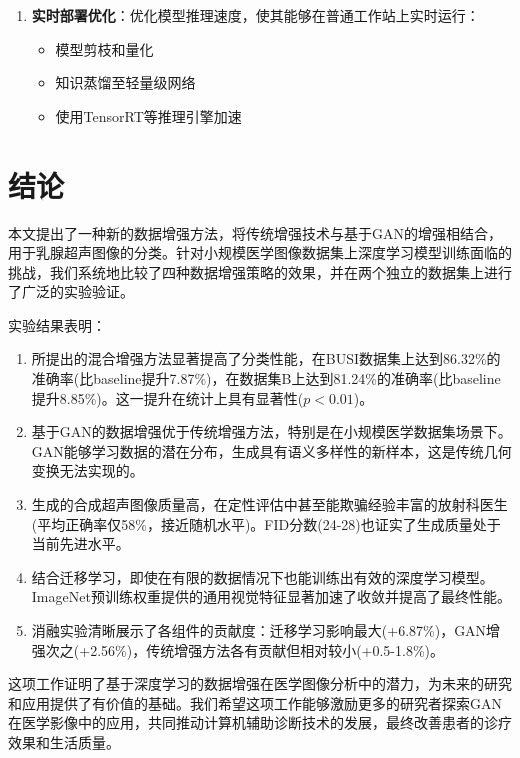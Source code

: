 \documentclass[supercite]{../Hust-undergraduate-translation/Experimental_Report}
\theoremstyle{definition}
\begin{document}
\begin{enumerate}
\item \textbf{实时部署优化}：优化模型推理速度，使其能够在普通工作站上实时运行：
   \begin{itemize}
   \item 模型剪枝和量化
   \item 知识蒸馏至轻量级网络
   \item 使用TensorRT等推理引擎加速
   \end{itemize}
\end{enumerate}

\section{结论}

本文提出了一种新的数据增强方法，将传统增强技术与基于GAN的增强相结合，用于乳腺超声图像的分类。针对小规模医学图像数据集上深度学习模型训练面临的挑战，我们系统地比较了四种数据增强策略的效果，并在两个独立的数据集上进行了广泛的实验验证。

实验结果表明：

\begin{enumerate}
\item 所提出的混合增强方法显著提高了分类性能，在BUSI数据集上达到86.32\%的准确率(比baseline提升7.87\%)，在数据集B上达到81.24\%的准确率(比baseline提升8.85\%)。这一提升在统计上具有显著性($p < 0.01$)。

\item 基于GAN的数据增强优于传统增强方法，特别是在小规模医学数据集场景下。GAN能够学习数据的潜在分布，生成具有语义多样性的新样本，这是传统几何变换无法实现的。

\item 生成的合成超声图像质量高，在定性评估中甚至能欺骗经验丰富的放射科医生(平均正确率仅58\%，接近随机水平)。FID分数(24-28)也证实了生成质量处于当前先进水平。

\item 结合迁移学习，即使在有限的数据情况下也能训练出有效的深度学习模型。ImageNet预训练权重提供的通用视觉特征显著加速了收敛并提高了最终性能。

\item 消融实验清晰展示了各组件的贡献度：迁移学习影响最大(+6.87\%)，GAN增强次之(+2.56\%)，传统增强方法各有贡献但相对较小(+0.5-1.8\%)。
\end{enumerate}

这项工作证明了基于深度学习的数据增强在医学图像分析中的潜力，为未来的研究和应用提供了有价值的基础。我们希望这项工作能够激励更多的研究者探索GAN在医学影像中的应用，共同推动计算机辅助诊断技术的发展，最终改善患者的诊疗效果和生活质量。


\end{document}
